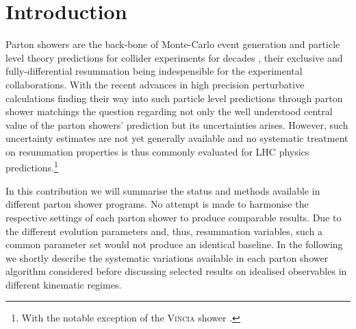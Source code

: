 \section{Introduction}
\label{sec:psunc:intro}

Parton showers are the back-bone of Monte-Carlo event generation and 
particle level theory predictions for collider experiments for decades
\cite{Fox:1979ag,Mazzanti:1980jj,Field:1982dg,Gottschalk:1982yt,
  Marchesini:1983bm,Field:1982vz,Odorico:1983yf,Sjostrand:1985xi,
  Ellis:1986bv,Marchesini:1987cf}, their exclusive and fully-differential 
resummation being indespensible for the experimental collaborations. 
With the recent advances in high precision perturbative calculations 
finding their way into such particle level predictions through 
parton shower matchings \cite{Frixione:2002ik,Nason:2004rx,Frixione:2007vw,
  Lavesson:2008ah,Hoeche:2011fd,Hamilton:2013fea,Hoeche:2014aia,Alioli:2013hqa}
the question regarding not only the well understood central value of 
the parton showers' prediction but its uncertainties arises. However, 
such uncertainty estimates are not yet generally available and no 
systematic treatment on resummation properties is thus commonly evaluated 
for LHC physics predictions.\footnote{With the notable exception of the 
\textsc{Vincia} shower \cite{Giele:2007di,Giele:2011cb}.}

In this contribution we will summarise the status and methods available 
in different parton shower programs. No attempt is made to harmonise the 
respective settings of each parton shower to produce comparable results. 
Due to the different evolution parameters and, thus, resummation variables, 
such a common parameter set would not produce an identical baseline. In the 
following we shortly describe the systematic variations available in each 
parton shower algorithm considered before discussing selected results on 
idealised observables in different kinematic regimes.



